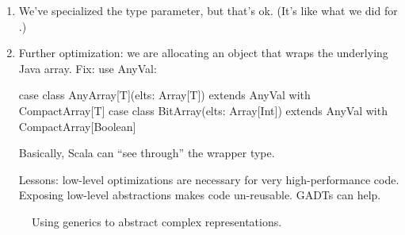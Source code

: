 \begin{instructor}
\begin{enumerate}
\item We've specialized the type parameter, but that's ok. (It's like what we did
  for .)

\item Further optimization: we are allocating an object that wraps the underlying
  Java array. Fix: use AnyVal:

\begin{scalacode}
  case class AnyArray[T](elts: Array[T]) extends AnyVal with CompactArray[T]
  case class BitArray(elts: Array[Int]) extends AnyVal with CompactArray[Boolean]
\end{scalacode}

Basically, Scala can ``see through'' the wrapper type.

Lessons: low-level optimizations are necessary for very high-performance code. Exposing low-level abstractions makes code un-reusable. GADTs can help.

\end{enumerate}

\end{instructor}

\begin{figure}
\caption{Using generics to abstract complex representations.}
\end{figure}
